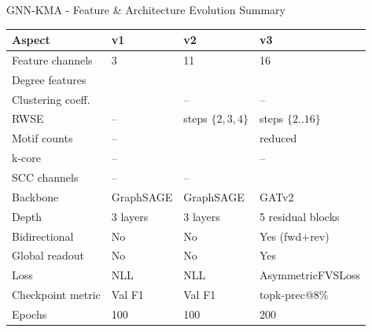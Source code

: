 \documentclass[aspectratio=169]{beamer}
\begin{document}
\begin{frame}{GNN-KMA - Feature \& Architecture Evolution Summary}
	\small
	\begin{center}
		\begin{tabular}{llll}
			\toprule
			\textbf{Aspect}                     & \textbf{v1}                   & \textbf{v2}       & \textbf{v3}            \\
			\midrule
			Feature channels                    & 3                             & 11                & 16                     \\
			Degree features                     & \checkmark                    & \checkmark        & \checkmark             \\
			Clustering coeff.\ \cite{watts1998} & \checkmark                    & --                & --                     \\
			RWSE \cite{dwivedi2021}             & --                            & steps $\{2,3,4\}$ & steps $\{2..16\}$      \\
			Motif counts \cite{ahmed2015}       & --                            & \checkmark        & reduced                \\
			k-core \cite{batagelj2003}          & --                            & \checkmark        & --                     \\
			SCC channels \cite{tarjan1972}      & --                            & --                & \checkmark             \\
			Backbone                            & GraphSAGE \cite{hamilton2017} & GraphSAGE         & GATv2 \cite{brody2022} \\
			Depth                               & 3 layers                      & 3 layers          & 5 residual blocks      \\
			Bidirectional                       & No                            & No                & Yes (fwd+rev)          \\
			Global readout                      & No                            & No                & Yes                    \\
			Loss                                & NLL                           & NLL               & AsymmetricFVSLoss      \\
			Checkpoint metric                   & Val F1                        & Val F1            & topk-prec@8\%          \\
			Epochs                              & 100                           & 100               & 200                    \\
			\bottomrule
		\end{tabular}
	\end{center}
\end{frame}
\end{document}
